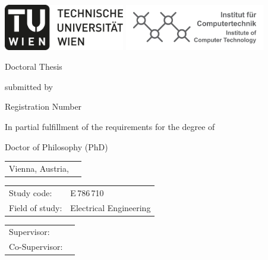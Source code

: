%
%
\begin{titlepage}

	\begin{center}

	\includegraphics[height=2cm]{fig/logo-tu-bw.png}%
	\hfill{}%
	\includegraphics[height=2cm]{fig/logo-ict.png}%
	

	\vspace{5em}

	{\Huge Doctoral Thesis}
	\vspace{3em}

	{\large submitted by}

	\vspace{3em}

	{\huge \theauthor}

	{\large Registration Number \registrationnumber}

	\vspace{5em}

	{\Huge \thetitle}

	\vspace{3em}
	{\large In partial fulfillment of the requirements for the degree of}

	\vspace{3em}

	{\Large Doctor of Philosophy (PhD)}

	\end{center}

	\vspace{3em}

	\large
	\begin{tabular}{m{}m{}}
	Vienna, Austria, \submissiondate & \\
	\end{tabular}

	\vspace{2em}

	\begin{tabular}{m{}m{}}
	Study code:     & E\,786\,710 \\
	Field of study: & Electrical Engineering \\
	\end{tabular}

	\vspace{2em}

	\begin{tabular}{m{}m{}}
	Supervisor:    & \supervisor \\
	Co-Supervisor: & \cosupervisor \\
	\end{tabular}

\end{titlepage}


